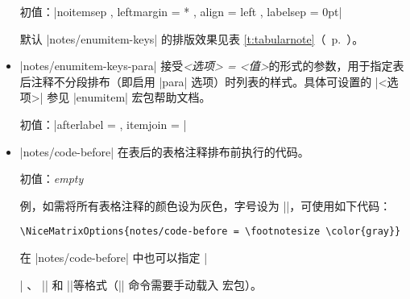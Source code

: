\documentclass[dvipsnames]{article}%
\begin{document}
\begin{itemize}[itemsep=\medskipamount]
初值：\quad |noitemsep , leftmargin = * , align = left , labelsep = 0pt|

默认 |notes/enumitem-keys| 的排版效果见表 \ref{t:tabularnote}（~p.~\pageref{t:tabularnote}）。


\item  |notes/enumitem-keys-para| 接受\textsl{<选项> = <值>}的形式的参数，用于指定表后注释不分段排布（即启用 |para| 选项）时列表的样式。具体可设置的 |<选项>| 参见 |enumitem| 宏包帮助文档。

初值：\quad |afterlabel = \nobreak, itemjoin = \quad|


\item |notes/code-before| 在表后的表格注释排布前执行的代码。

初值：\textsl{empty}

例，如需将所有表格注释的颜色设为灰色，字号设为 |\footnotesize|，可使用如下代码：
\begin{Verbatim}
\NiceMatrixOptions{notes/code-before = \footnotesize \color{gray}}
\end{Verbatim}
在 |notes/code-before| 中也可以指定 |\raggedright| 、 |\RaggedRight| 和 |\RaggedRight|等格式（|\RaggedRight| 命令需要手动载入  宏包）。
\end{itemize}
\end{document}
